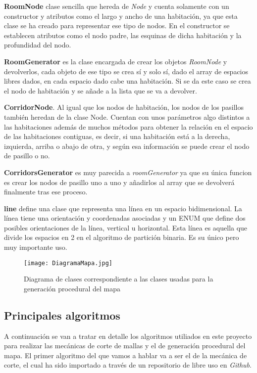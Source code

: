 \textbf{RoomNode} clase sencilla que hereda de \textit{Node} y cuenta solamente con un constructor y atributos como el largo y ancho de una habitación, ya que esta clase se ha creado para representar ese tipo de nodos. En el constructor se establecen atributos como el nodo padre, las esquinas de dicha habitación y la profundidad del nodo.

\textbf{RoomGenerator} es la clase encargada de crear los objetos \textit{RoomNode} y devolverlos, cada objeto de ese tipo se crea sí y solo sí, dado el array de espacios libres dados, en cada espacio dado cabe una habitación. Si se da este caso se crea el nodo de habitación y se añade a la lista que se va a devolver.

\textbf{CorridorNode}. Al igual que los nodos de habitación, los nodos de los pasillos también heredan de la clase Node. Cuentan con unos parámetros algo distintos a las habitaciones además de muchos métodos para obtener la relación en el espacio de las habitaciones contiguas, es decir, si una habitación está a la derecha, izquierda, arriba o abajo de otra, y según esa información se puede crear el nodo de pasillo o no.

\textbf{CorridorsGenerator} es muy parecida a \textit{roomGenerator} ya que su única funcion es crear los nodos de pasillo uno a uno y añadirlos al array que se devolverá finalmente tras ese proceso.

\textbf{line} define una clase que representa una línea en un espacio bidimensional. La línea tiene una orientación y coordenadas asociadas y un ENUM que define dos posibles orientaciones de la línea, vertical u horizontal. Esta línea es aquella que divide los espacios en 2 en el algoritmo de partición binaria. Es su único pero muy importante uso.

\begin{figure}[H]
    \centering
    \texttt{[image: DiagramaMapa.jpg]}
    \caption{Diagrama de clases correspondiente a las clases usadas para la generación procedural del mapa}
\end{figure}

\subsection{Principales algoritmos}

A continuación se van a tratar en detalle los algoritmos utiliados en este proyecto para realizar las mecánicas de corte de mallas y el de generación procedural del mapa. El primer algoritmo del que vamos a hablar va a ser el de la mecánica de corte, el cual ha sido importado a través de un repositorio de libre uso en \textit{Github}. 

